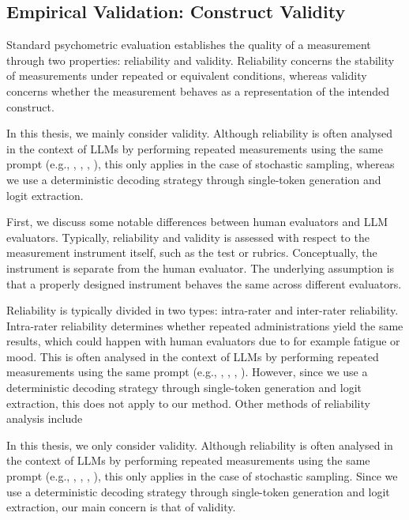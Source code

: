 \subsection{Empirical Validation: Construct Validity}

Standard psychometric evaluation establishes the quality of a measurement through two properties: reliability and validity. Reliability concerns the stability of measurements under repeated or equivalent conditions, whereas validity concerns whether the measurement behaves as a representation of the intended construct.

In this thesis, we mainly consider validity. Although reliability is often analysed in the context of LLMs by performing repeated measurements using the same prompt (e.g., \citep{manning2025human}, \citep{wang2025evaluating}, \citep{chehbouni2025neither}, \citep{yavuz2025utilizing}), this only applies in the case of stochastic sampling, whereas we use a deterministic decoding strategy through single-token generation and logit extraction. 




\newpage

First, we discuss some notable differences between human evaluators and LLM evaluators. Typically, reliability and validity is assessed with respect to the measurement instrument itself, such as the test or rubrics. Conceptually, the instrument is separate from the human evaluator. The underlying assumption is that a properly designed instrument behaves the same across different evaluators. 

Reliability is typically divided in two types: intra-rater and inter-rater reliability. Intra-rater reliability determines whether repeated administrations yield the same results, which could happen with human evaluators due to for example fatigue or mood. This is often analysed in the context of LLMs by performing repeated measurements using the same prompt (e.g., \citep{manning2025human}, \citep{wang2025evaluating}, \citep{chehbouni2025neither}, \citep{yavuz2025utilizing}). However, since we use a deterministic decoding strategy through single-token generation and logit extraction, this does not apply to our method. Other methods of reliability analysis include 



In this thesis, we only consider validity. Although reliability is often analysed in the context of LLMs by performing repeated measurements using the same prompt (e.g., \citep{manning2025human}, \citep{wang2025evaluating}, \citep{chehbouni2025neither}, \citep{yavuz2025utilizing}), this only applies in the case of stochastic sampling. Since we use a deterministic decoding strategy through single-token generation and logit extraction, our main concern is that of validity. 

